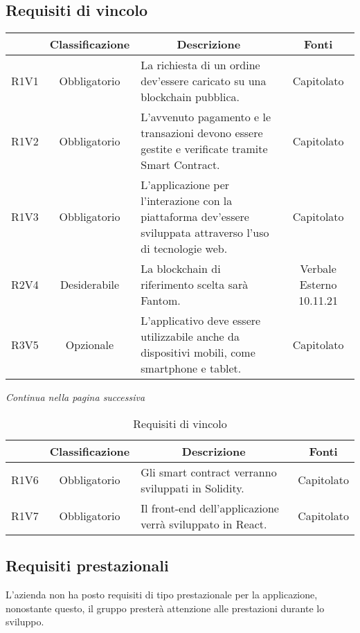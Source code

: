 \subsection{Requisiti di vincolo} \label{subsection:requisiti_vincolo}
\begin{table}[H]
    \centering
    \renewcommand{\arraystretch}{1.8}
    \begin{tabular}{c | c | p{6cm} | c}
        \rowcolor[HTML]{125E28}
        \multicolumn{1}{c}{\color[HTML]{FFFFFF} \textbf{Codice}} & 
		\multicolumn{1}{c}{\color[HTML]{FFFFFF} \textbf{Classificazione}} & 
		\multicolumn{1}{c}{\color[HTML]{FFFFFF} \textbf{Descrizione}} & 
		\multicolumn{1}{c}{\color[HTML]{FFFFFF} \textbf{Fonti}} \\
        \hline
		R1V1 & Obbligatorio & La richiesta di un ordine dev'essere caricato su una blockchain pubblica. & Capitolato \\
        R1V2 & Obbligatorio & L'avvenuto pagamento e le transazioni devono essere gestite e verificate tramite Smart Contract. & Capitolato \\
        R1V3 & Obbligatorio & L'applicazione per l'interazione con la piattaforma dev'essere sviluppata attraverso l'uso di tecnologie web. & Capitolato \\ 
        R2V4 & Desiderabile & La blockchain di riferimento scelta sarà Fantom. & Verbale Esterno 10.11.21 \\
        R3V5 & Opzionale & L'applicativo deve essere utilizzabile anche da dispositivi mobili, come smartphone e tablet. & Capitolato \\                       
    \end{tabular}
\end{table}
\begin{center}
    \textit{\small Continua nella pagina successiva}
\end{center}
\begin{table}[H]
    \centering
    \renewcommand{\arraystretch}{1.8}
    \begin{tabular}{c | c | p{5cm} | c}
        \rowcolor[HTML]{125E28} 
        \multicolumn{1}{c}{\color[HTML]{FFFFFF} \textbf{Codice}} & 
		\multicolumn{1}{c}{\color[HTML]{FFFFFF} \textbf{Classificazione}} & 
		\multicolumn{1}{c}{\color[HTML]{FFFFFF} \textbf{Descrizione}} & 
		\multicolumn{1}{c}{\color[HTML]{FFFFFF} \textbf{Fonti}} \\
        \hline
        R1V6 & Obbligatorio & Gli smart contract verranno sviluppati in Solidity. & Capitolato \\
        R1V7 & Obbligatorio & Il front-end dell'applicazione verrà sviluppato in React. & Capitolato \\ 
    \end{tabular}
    \caption{Requisiti di vincolo}
\end{table}

\subsection{Requisiti prestazionali} \label{subsection:requisiti_prestazionali}

L'azienda non ha posto requisiti di tipo prestazionale per la applicazione,
nonostante questo, il gruppo presterà attenzione alle prestazioni durante lo sviluppo.

\clearpage
